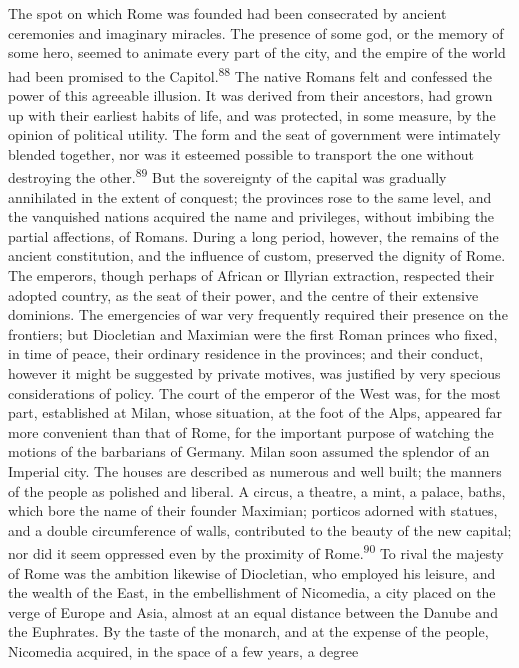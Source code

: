 The spot on which Rome was founded had been consecrated by
ancient ceremonies and imaginary miracles. The presence of some
god, or the memory of some hero, seemed to animate every part of
the city, and the empire of the world had been promised to the
Capitol.\textsuperscript{88} The native Romans felt and confessed the power of
this agreeable illusion. It was derived from their ancestors, had
grown up with their earliest habits of life, and was protected,
in some measure, by the opinion of political utility. The form
and the seat of government were intimately blended together, nor
was it esteemed possible to transport the one without destroying
the other.\textsuperscript{89} But the sovereignty of the capital was gradually
annihilated in the extent of conquest; the provinces rose to the
same level, and the vanquished nations acquired the name and
privileges, without imbibing the partial affections, of Romans.
During a long period, however, the remains of the ancient
constitution, and the influence of custom, preserved the dignity
of Rome. The emperors, though perhaps of African or Illyrian
extraction, respected their adopted country, as the seat of their
power, and the centre of their extensive dominions. The
emergencies of war very frequently required their presence on the
frontiers; but Diocletian and Maximian were the first Roman
princes who fixed, in time of peace, their ordinary residence in
the provinces; and their conduct, however it might be suggested
by private motives, was justified by very specious considerations
of policy. The court of the emperor of the West was, for the most
part, established at Milan, whose situation, at the foot of the
Alps, appeared far more convenient than that of Rome, for the
important purpose of watching the motions of the barbarians of
Germany. Milan soon assumed the splendor of an Imperial city. The
houses are described as numerous and well built; the manners of
the people as polished and liberal. A circus, a theatre, a mint,
a palace, baths, which bore the name of their founder Maximian;
porticos adorned with statues, and a double circumference of
walls, contributed to the beauty of the new capital; nor did it
seem oppressed even by the proximity of Rome.\textsuperscript{90} To rival the
majesty of Rome was the ambition likewise of Diocletian, who
employed his leisure, and the wealth of the East, in the
embellishment of Nicomedia, a city placed on the verge of Europe
and Asia, almost at an equal distance between the Danube and the
Euphrates. By the taste of the monarch, and at the expense of the
people, Nicomedia acquired, in the space of a few years, a degree
